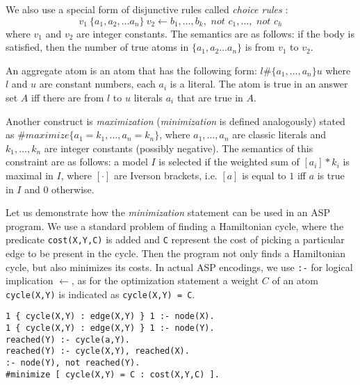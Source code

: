 We also use a special form of disjunctive rules called \textit{choice rules} \parencite{ASPbook}:
\begin{equation*}
  v_1~\{ a_1, a_2, \dots a_n \}~v_2 \leftarrow b_1, \dots, b_k, \textit{ not }c_1,\dots,\textit{ not }c_h
\end{equation*}
where $v_1$ and $v_2$ are integer constants. The semantics are as follows: if the body is satisfied, then the number of true atoms in $\{ a_1, a_2 \dots a_n \}$ is from $v_1$ to $v_2$.

An aggregate atom is an atom that has the following form: $l \# \{ a_1, \dots ,a_n \} u$
where $l$ and $u$ are constant numbers, each $a_i$ is a literal. The atom is true in an answer set $A$ iff there are from $l$ to $u$ literals $a_i$ that are true in $A$.

Another construct is \textit{maximization} \parencite{ASPbook, leone} (\textit{minimization} is defined analogously) stated as $\#\textit{maximize}\{ a_1=k_1, \dots, a_n=k_n \}$, 
where $a_1, \dots, a_n$ are classic literals and $k_1, \dots, k_n$ are integer constants (possibly negative). The semantics of this constraint are as follows: a model $I$ is selected if the weighted sum of $[a_i]*k_i$ is maximal in $I$, where $[\cdot]$ are Iverson brackets, i.e. $[a]$ is equal to $1$ iff $a$ is true in $I$ and $0$ otherwise.

\begin{example}
    \pubrev
    Let us demonstrate how the \textit{minimization} statement can be used in an ASP program. We use a standard problem of finding a Hamiltonian cycle, where the predicate \texttt{cost(X,Y,C)} is added and \texttt{C} represent the cost of picking a particular edge to be present in the cycle. Then the program not only finds a Hamiltonian cycle, but also minimizes its costs. In actual ASP encodings, we use \texttt{:-} for logical implication $\leftarrow$, as for the optimization statement a weight $C$ of an atom \texttt{cycle(X,Y)} is indicated as \texttt{cycle(X,Y) = C}.
\begin{minipage}{\linewidth}
    \begin{lstlisting}[caption=ASP encoding of the Hamiltonian cycle problem (due to \textcite{ASPbook}), label=lst:example_asp_coloring,basicstyle=\ttfamily]
1 { cycle(X,Y) : edge(X,Y) } 1 :- node(X). 
1 { cycle(X,Y) : edge(X,Y) } 1 :- node(Y).
reached(Y) :- cycle(a,Y).
reached(Y) :- cycle(X,Y), reached(X).
:- node(Y), not reached(Y).
#minimize [ cycle(X,Y) = C : cost(X,Y,C) ].
\end{lstlisting}
\end{minipage}
\pubrevend
\end{example}


